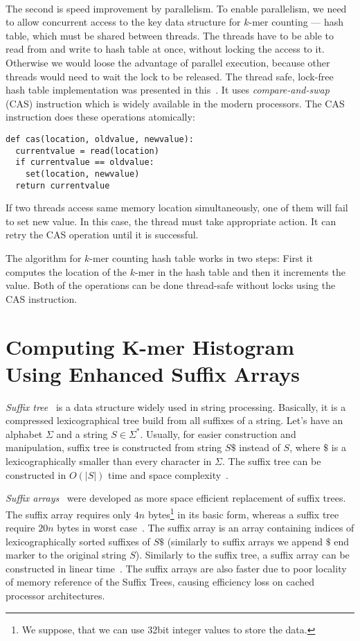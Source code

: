 \paragraph{} The second is speed improvement by parallelism. To enable parallelism, we need to allow concurrent access to the key data structure for $k$-mer counting --- hash table, which must be shared between threads. The threads have to be able to read from and write to hash table at once, without locking the access to it. Otherwise we would loose the advantage of parallel execution, because other threads would need to wait the lock to be released. The thread safe, lock-free hash table implementation was presented in this~\cite{jellyfish}. It uses \emph{compare-and-swap} (CAS) instruction which is widely available in the modern processors. The CAS instruction does these operations atomically:
\begin{lstlisting}
def cas(location, oldvalue, newvalue):
  currentvalue = read(location)
  if currentvalue == oldvalue:
    set(location, newvalue)
  return currentvalue
\end{lstlisting}
If two threads access same memory location simultaneously, one of them will fail to set new value. In this case, the thread must take appropriate action.
It can retry the CAS operation until it is successful.

The algorithm for $k$-mer counting hash table works in two steps:
First it computes the location of the $k$-mer in the hash table and then it increments the value. Both of the operations can be done thread-safe without locks using the CAS instruction.

\section[Enhanced Suffix Arrays]{Computing K-mer Histogram Using Enhanced Suffix Arrays}

\emph{Suffix tree}~\cite{suffixtree} is a data structure widely used in string processing. Basically, it is a compressed lexicographical tree build from all suffixes of a string. Let's have an alphabet $\Sigma$ and a string $S \in \Sigma^*$. Usually, for easier construction and manipulation, suffix tree is constructed from string $S\$$ instead of $S$, where $\$$ is a lexicographically smaller than every character in $\Sigma$. The suffix tree can be constructed in $O(|S|)$ time and space complexity~\cite{suffixtree}.

\emph{Suffix arrays}~\cite{suffixarray} were developed as more space efficient replacement of suffix trees. The suffix array requires only $4n$ bytes\footnote{We suppose, that we can use 32bit integer values to store the data.} in its basic form, whereas a suffix tree require $20n$ bytes in worst case~\cite{kurtz1999reducing}. The suffix array is an array containing indices of lexicographically sorted suffixes of $S\$$ (similarly to suffix arrays we append $\$$ end marker to the original string $S$). Similarly to the suffix tree, a suffix array can be constructed in linear time~\cite{karkkainen2003simple, kim2003linear, ko2003space}. The suffix arrays are also faster due to poor locality of memory reference of the Suffix Trees, causing efficiency loss on cached processor architectures.

